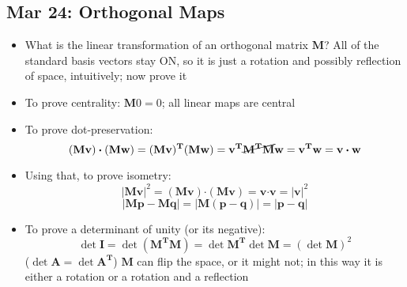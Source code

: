 \documentclass[10pt, oneside]{article}
\newcommand{\Cdot}{\boldsymbol{\cdot}}
\renewcommand{\vec}[1]{\mathbf{#1}}
\newcommand{\mat}[1]{\mathbf{#1}}
\begin{document}
\subsection{Mar 24: Orthogonal Maps}
\begin{itemize}
    \item What is the linear transformation of an orthogonal matrix $\mat{M}$? All of the standard basis vectors stay ON, so it is just a rotation and possibly reflection of space, intuitively; now prove it
    \item To prove centrality: $\mat{M} 0 = 0$; all linear maps are central
    \item To prove dot-preservation:
            \[(\mat{M}\vec{v})\Cdot(\mat{M}\vec{w}) = (\mat{M}\vec{v})^\mat{T}(\mat{M}\vec{w}) = \vec{v^T}\cancel{\mat{M^T}\mat{M}}\vec{w} = \vec{v^T}\vec{w} = \vec{v}\Cdot\vec{w}\]
    \item Using that, to prove isometry:
            \[|\mat{M}\vec{v}|^2 = (\mat{M}\vec{v}) \Cdot (\mat{M}\vec{v}) = \vec{v} \Cdot \vec{v} = |\vec{v}|^2\]
            \[|\mat{M}\vec{p} - \mat{M}\vec{q}| = |\mat{M}(\vec{p}-\vec{q})| = |\vec{p}-\vec{q}|\]
    \item To prove a determinant of unity (or its negative):
            \[\det \mat{I} = \det (\mat{M^T}\mat{M}) = \det\mat{M^T}\det\mat{M} = (\det\mat{M})^2\]
        ($\det \mat{A} = \det \mat{A^T}$) $\mat{M}$ can flip the space, or it might not; in this way it is either a rotation or a rotation and a reflection
\end{itemize}
\end{document}
